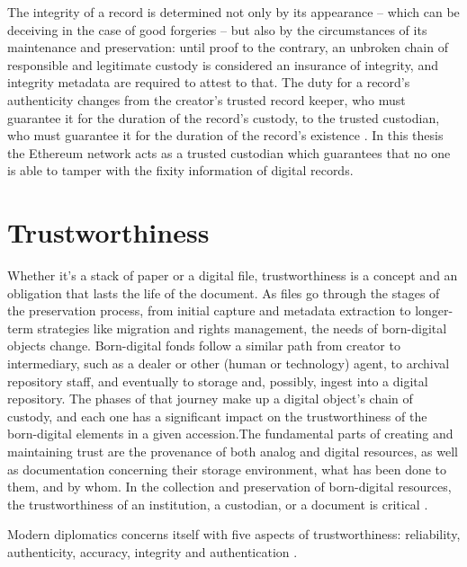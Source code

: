 The integrity of a record is determined not only by its appearance – which can be deceiving in the case of good forgeries – but also by the circumstances of its maintenance and preservation: until proof to the contrary, an unbroken chain of responsible and legitimate custody is considered an insurance of integrity, and integrity metadata are required to attest to that. The duty for a record's authenticity changes from the creator's trusted record keeper, who must guarantee it for the duration of the record's custody, to the trusted custodian, who must guarantee it for the duration of the record's existence \cite[53]{duranti2009digital}. In this thesis the Ethereum network acts as a trusted custodian which guarantees that no one is able to tamper with the fixity information of digital records.

\section{Trustworthiness}
Whether it's a stack of paper or a digital file, trustworthiness is a concept and an obligation that lasts the life of the document. As files go through the stages of the preservation process, from initial capture and metadata extraction to longer-term strategies like migration and rights management, the needs of born-digital objects change. Born-digital fonds follow a similar path from creator to intermediary, such as a dealer or other (human or technology) agent, to archival repository staff, and eventually to storage and, possibly, ingest into a digital repository. The phases of that journey make up a digital object's chain of custody, and each one has a significant impact on the trustworthiness of the born-digital elements in a given accession.\newline The fundamental parts of creating and maintaining trust are the provenance of both analog and digital resources, as well as documentation concerning their storage environment, what has been done to them, and by whom. In the collection and preservation of born-digital resources, the trustworthiness of an institution, a custodian, or a document is critical \cite[27]{kirschenbaum2010digital}. 

Modern diplomatics concerns itself with five aspects of trustworthiness: reliability, authenticity, accuracy, integrity and authentication \cite[10]{kirschenbaum2010digital}.


